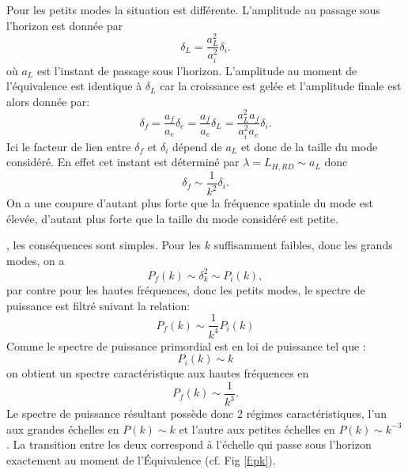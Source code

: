 Pour les petits modes la situation est différente. L'amplitude au passage sous l'horizon est donnée par
\begin{equation}
\delta_L=\frac{a_L^2}{a_i^2}\delta_i.
\end{equation}
où $a_L$ est l'instant de passage sous l'horizon. L'amplitude au moment de l'équivalence est identique à $\delta_L$ car la croissance est gelée et l'amplitude finale est alors donnée par:
\begin{equation}
\delta_f=\frac{a_f}{a_e}\delta_e=\frac{a_f}{a_e}\delta_L=\frac{a_L^2 a_f}{a_i^2 a_e}\delta_i.
\end{equation}
Ici le facteur de lien entre $\delta_f$ et $\delta_i$ dépend de $a_L$ et donc de la taille du mode considéré. En effet cet instant est déterminé par $\lambda = L_{H,RD} \sim a_L$ donc 
\begin{equation}
\delta_f \sim \frac{1}{k^2} \delta_i.
\end{equation}
On a une coupure d'autant plus forte que la fréquence spatiale du mode est élevée, d'autant plus forte que la taille du mode considéré est petite.

, les conséquences sont simples. Pour les $k$ suffisamment faibles, donc les grands modes, on a 
\begin{equation}
P_f(k)\sim\delta_k^2 \sim P_i(k),
\end{equation}
par contre pour les hautes fréquences, donc les petits modes, le spectre de puissance est filtré suivant la relation:
\begin{equation}
P_f(k)\sim \frac{1}{k^4} P_i(k)
\end{equation}
Comme le spectre de puissance primordial est en loi de puissance tel que :
\begin{equation}
P_i(k)\sim k
\end{equation}
on obtient un spectre caractéristique aux hautes fréquences en 
\begin{equation}
P_f(k)\sim\frac{1}{k^3}.
\end{equation}
Le spectre de puissance résultant possède donc 2 régimes caractéristiques, l'un aux grandes échelles en $P(k)\sim k$ et l'autre aux petites échelles en $P(k)\sim k^{-3}$. La transition entre les deux correspond à l'échelle qui passe sous l'horizon exactement au moment de l'Équivalence (cf. Fig \ref{f:pk}).

